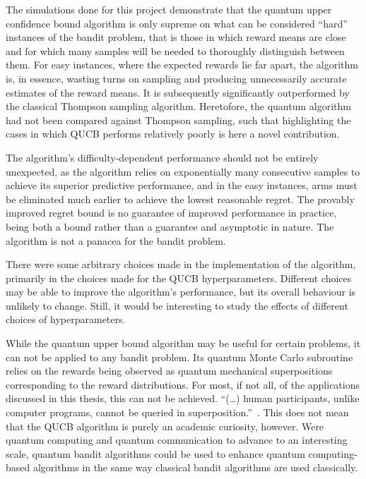 The simulations done for this project demonstrate that the quantum upper confidence bound algorithm is only supreme on what can be considered \enquote{hard} instances of the bandit problem, that is those in which reward means are close and for which many samples will be needed to thoroughly distinguish between them.
For easy instances, where the expected rewards lie far apart, the algorithm is, in essence, wasting turns on sampling and producing unnecessarily accurate estimates of the reward means.
It is subsequently significantly outperformed by the classical Thompson sampling algorithm.
Heretofore, the quantum algorithm had not been compared against Thompson sampling, such that highlighting the cases in which QUCB performs relatively poorly is here a novel contribution.

The algorithm's difficulty-dependent performance should not be entirely unexpected, as the algorithm relies on exponentially many consecutive samples to achieve its superior predictive performance, and in the easy instances, arms must be eliminated much earlier to achieve the lowest reasonable regret.
The provably improved regret bound is no guarantee of improved performance in practice, being both a bound rather than a guarantee and asymptotic in nature.
The algorithm is not a panacea for the bandit problem.

There were some arbitrary choices made in the implementation of the algorithm, primarily in the choices made for the QUCB hyperparameters.
Different choices may be able to improve the algorithm's performance, but its overall behaviour is unlikely to change.
Still, it would be interesting to study the effects of different choices of hyperparameters.

While the quantum upper bound algorithm may be useful for certain problems, it can not be applied to any bandit problem.
Its quantum Monte Carlo subroutine relies on the rewards being observed as quantum mechanical superpositions corresponding to the reward distributions.
For most, if not all, of the applications discussed in this thesis\footnotemark, this can not be achieved.
\enquote{(\dots) human participants, unlike computer programs, cannot be queried in superposition.}~\autocite{wang2021}.
This does not mean that the QUCB algorithm is purely an academic curiosity, however.
Were quantum computing and quantum communication to advance to an interesting scale, quantum bandit algorithms could be used to enhance quantum computing-based algorithms in the same way classical bandit algorithms are used classically.

